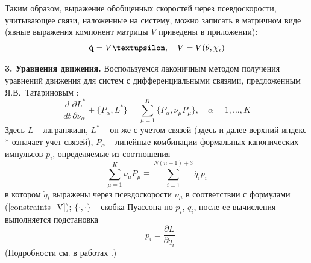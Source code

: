 Таким образом, выражение обобщенных скоростей через псевдоскорости, учитывающее связи, наложенные на систему, можно записать в матричном виде (явные выражения компонент матрицы $V$ приведены в приложении):
\begin{equation}\label{constraints_V}
    \dot{\vec{q}} = V\vnu,\quad V = V(\theta,\chi_i)
\end{equation}

{\bf 3. Уравнения движения.}
Воспользуемся лаконичным методом получения уравнений движения для систем с дифференциальными связями, предложенным Я.В.~Татариновым \cite{Tatarinov}:
\begin{equation}\label{Tatarinov}
    \frac{d}{dt}\frac{\partial L^{*}}{\partial \nu_\alpha}  + \{P_\alpha, L^{*}\} = \sum\limits_{\mu = 1}^{K}\{P_\alpha, \nu_\mu P_\mu\},\quad \alpha = 1,\dots, K
\end{equation}
Здесь $L$ -- лагранжиан, $L^*$ -- он же с учетом связей (здесь и далее верхний индекс $*$ означает учет связей), $P_\alpha$ -- линейные комбинации формальных канонических импульсов $p_i$, определяемые из соотношения 
$$\sum\limits_{\mu=1}^{K}\nu_\mu P_\mu \equiv \sum\limits_{i=1}^{N(n+1)+3}\dot{q_i} p_i$$
 в котором $\dot{q}_i$ выражены через псевдоскорости $\nu_\mu$ в соответствии с формулами (\ref{constraints_V}); $\{\cdot, \cdot\}$ -- скобка Пуассона по $p_i$, $q_i$, после ее вычисления выполняется подстановка 
$$\hspace{10pt} p_i = \frac{\partial L}{\partial \dot{q}_i}$$
(Подробности см. в работах \cite{Tatarinov,Zobova2011}.)

